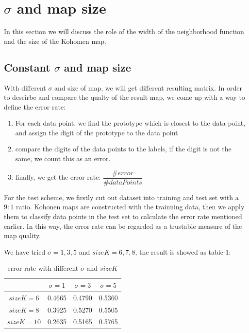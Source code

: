 \documentclass[a4paper, 12pt]{article}
\begin{document}
\section{$\sigma$ and map size}
In this section we will discuss the role of the width of the neighborhood function and the size of the Kohomen map.

\subsection{Constant $\sigma$ and map size}

With different $\sigma$ and size of map, we will get different
resulting matrix. In order to descirbe and compare the qualty of the
result map, we come up with a way to define the error rate:

\begin{enumerate}
\item For each data point, we find the prototype which is closest to
  the data point, and assign the digit of the prototype to the data
  point
\item compare the digits of the data points to the labels, if the
  digit is not the same, we count this as an error.
\item finally, we get the error rate: $\dfrac{\#error}{\#dataPoints}$
\end{enumerate}

For the test scheme, we firstly cut out dataset into training and test
set with a $9:1$ ratio. Kohonen maps are constructed with the
trainning data, then we apply them to classify data points in the test
set to calculate the error rate mentioned earlier. In this way, the
error rate can be regarded as a trustable measure of the map quality.

We have tried $\sigma = 1, 3, 5$ and $sizeK = 6, 7, 8$, the result is showed as table-1:

\begin{table}[!hbp]
\centering
\begin{tabular}{|c|c|c|c|}
\hline
 & $\sigma = 1$ & $\sigma = 3$ & $\sigma = 5$\\
\hline
$sizeK = 6$ &  0.4665 & 0.4790 & 0.5360\\
\hline
$sizeK = 8$ & 0.3925 & 0.5270 & 0.5505\\
\hline
$sizeK = 10$ & 0.2635 & 0.5165 & 0.5765\\
\hline
\end{tabular}
\caption{error rate with different $\sigma$ and $sizeK$}
\end{table}
\end{document}
